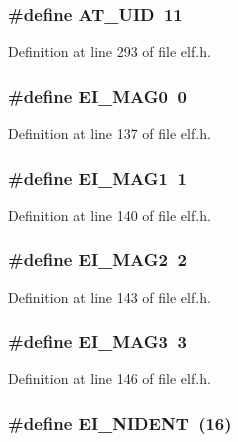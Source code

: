\subsubsection[{AT\_\-UID}]{\setlength{\rightskip}{0pt plus 5cm}\#define AT\_\-UID~11}\label{elf_8h_7bc508a179d0a308a8e4b47b97bcf2a3}




Definition at line 293 of file elf.h.
\subsubsection[{EI\_\-MAG0}]{\setlength{\rightskip}{0pt plus 5cm}\#define EI\_\-MAG0~0}\label{elf_8h_ba717f40a418b0d99c2efd4cdab4f54f}




Definition at line 137 of file elf.h.
\subsubsection[{EI\_\-MAG1}]{\setlength{\rightskip}{0pt plus 5cm}\#define EI\_\-MAG1~1}\label{elf_8h_2cae3878d982911632b418680718d53b}




Definition at line 140 of file elf.h.
\subsubsection[{EI\_\-MAG2}]{\setlength{\rightskip}{0pt plus 5cm}\#define EI\_\-MAG2~2}\label{elf_8h_2884a339ef7aefee59d160ed3fbb1739}




Definition at line 143 of file elf.h.
\subsubsection[{EI\_\-MAG3}]{\setlength{\rightskip}{0pt plus 5cm}\#define EI\_\-MAG3~3}\label{elf_8h_ce03d4c5e8952e27b8505581432c3b84}




Definition at line 146 of file elf.h.
\subsubsection[{EI\_\-NIDENT}]{\setlength{\rightskip}{0pt plus 5cm}\#define EI\_\-NIDENT~(16)}\label{elf_8h_e407130db14180c6737390604ba7c1fe}




